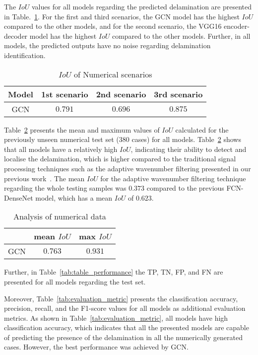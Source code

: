 \documentclass[runningheads]{llncs}
\begin{document}
The \(IoU\) values for all models regarding the predicted delamination are presented in Table.~\ref{tab:table_numerical_scenarios}.
For the first and third scenarios, the GCN model has the highest \(IoU\) compared to the other models, and for the second scenario, the VGG16 encoder-decoder model has the highest \(IoU\) compared to the other models.
Further, in all models, the predicted outputs have no noise regarding delamination identification.
\begin{table}[]
	\centering
	\caption{\(IoU\) of Numerical scenarios}
	\label{tab:table_numerical_scenarios}
	{
		\begin{tabular}{cccc}\hline
			Model & 1st scenario & 2nd scenario & 3rd scenario \\ \hline 
			GCN & \(0.791\) & \(0.696\) & \(0.875\) \\ \hline
		\end{tabular}
	}
\end{table}
Table~\ref{tab:table_iou} presents the mean and maximum values of \(IoU\) calculated for the previously unseen numerical test set (380 cases) for all models.
Table~\ref{tab:table_iou} shows that all models have a relatively high \(IoU\), indicating their ability to detect and localise the delamination, which is higher compared to the traditional signal processing techniques such as the adaptive wavenumber filtering presented in our previous work~\cite{Ijjeh2021}. 
The mean \(IoU\) for the adaptive wavenumber filtering technique regarding the whole testing samples was \(0.373\) compared to the previous FCN-DenseNet model, which has a mean \(IoU\) of \(0.623\).
\begin{table}[]
	\centering
	\caption{Analysis of numerical data}
	\label{tab:table_iou}
	\begin{tabular}{ccc}\hline
		 & mean \(IoU\) & max \(IoU\) \\ \hline
		GCN & \(0.763\) & \(0.931\) \\ \hline
	\end{tabular}
\end{table}
Further, in Table~\ref{tab:table_performance} the TP, TN, FP, and FN are presented for all models regarding the test set. 

Moreover, Table~\ref{tab:evaluation_metric} presents the classification accuracy, precision, recall, and the F1-score values for all models as additional evaluation metrics.
As shown in Table~\ref{tab:evaluation_metric}, all models have high classification accuracy, which indicates that all the presented models are capable of predicting the presence of the delamination in all the numerically generated cases. 
However, the best performance was achieved by GCN.
\end{document}
